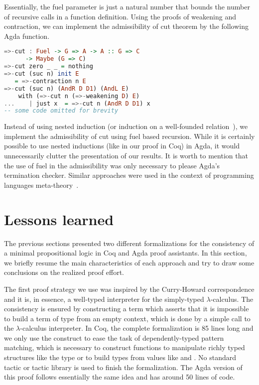 Essentially, the fuel parameter is just a natural number that bounds the number of recursive calls in a function definition.
Using the proofs of weakening and contraction, we can implement
the admissibility of cut theorem by the following Agda function.



\begin{lstlisting}[language=haskell]
=>-cut : Fuel -> G => A -> A :: G => C
      -> Maybe (G => C)
=>-cut zero _ _ = nothing
=>-cut (suc n) init E
   = =>-contraction n E
=>-cut (suc n) (AndR D D1) (AndL E)
    with (=>-cut n (=>-weakening D) E)
...    | just x  = =>-cut n (AndR D D1) x
-- some code omitted for brevity
\end{lstlisting}



Instead of using nested induction (or induction on a well-founded relation~\cite{Bertot04}), we implement the
admissibility of cut using fuel based recursion. While it is certainly possible to use nested inductions
(like in our proof in Coq) in Agda, it would unnecessarily clutter the presentation of our results. It is worth to
mention that the use of fuel in the admissibility was only necessary to please Agda's termination checker. Similar
approaches were used in the context of programming languages meta-theory~\cite{Amin17}.


\section{Lessons learned}\label{sec:lessons}


The previous sections presented two different formalizations for the consistency of a minimal
propositional logic in Coq and Agda proof assistants. In this section, we briefly resume the
main characteristics of each approach and try to draw some conclusions on the
realized proof effort.


The first proof strategy we use was inspired by the Curry-Howard correspondence and it is,
in essence, a well-typed interpreter for the
simply-typed $\lambda$-calculus. The consistency is ensured by constructing a term
which asserts that it is impossible to build a term of type  from an empty
context, which is done by a simple call to the $\lambda$-calculus interpreter.
In Coq, the complete formalization is 85 lines long and we only use the  construct
to ease the task of dependently-typed pattern matching, which is necessary
to construct functions to manipulate richly typed structures like the type  or to
build types from values like  and . No standard tactic or
tactic library is used to finish the formalization. The Agda version of this proof
follows essentially the same idea and has around 50 lines of code.


